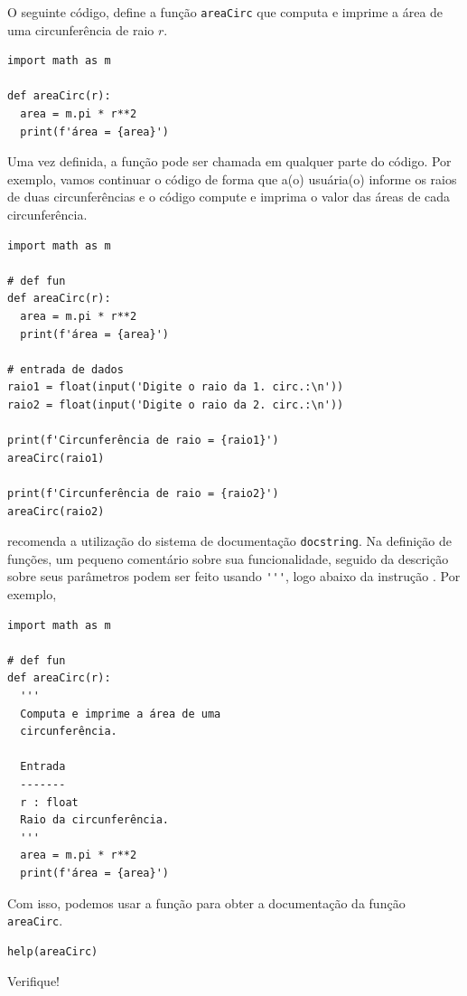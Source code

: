 \begin{ex}\label{cap_fun_sec_def:ex:areaCirc}
  O seguinte código, define a função \lstinline+areaCirc+ que computa e imprime a área de uma circunferência de raio $r$.

\begin{lstlisting}
import math as m

def areaCirc(r):
  area = m.pi * r**2
  print(f'área = {area}')
\end{lstlisting}

Uma vez definida, a função pode ser chamada em qualquer parte do código. Por exemplo, vamos continuar o código de forma que a(o) usuária(o) informe os raios de duas circunferências e o código compute e imprima o valor das áreas de cada circunferência.

\begin{lstlisting}
import math as m

# def fun
def areaCirc(r):
  area = m.pi * r**2
  print(f'área = {area}')
    
# entrada de dados
raio1 = float(input('Digite o raio da 1. circ.:\n'))
raio2 = float(input('Digite o raio da 2. circ.:\n'))

print(f'Circunferência de raio = {raio1}')
areaCirc(raio1)

print(f'Circunferência de raio = {raio2}')
areaCirc(raio2)
\end{lstlisting}

\end{ex}

\begin{obs}
  {\python} recomenda a utilização do sistema de documentação \texttt{docstring}. Na definição de funções, um pequeno comentário sobre sua funcionalidade, seguido da descrição sobre seus parâmetros podem ser feito usando \lstinline+'''+, logo abaixo da instrução {\PYTHONdef}. Por exemplo,

\begin{lstlisting}
import math as m

# def fun
def areaCirc(r):
  '''
  Computa e imprime a área de uma
  circunferência.

  Entrada
  -------
  r : float
  Raio da circunferência.
  '''
  area = m.pi * r**2
  print(f'área = {area}')
\end{lstlisting}

Com isso, podemos usar a função {\PYTHONhelp} para obter a documentação da função \lstinline+areaCirc+.

\begin{lstlisting}
help(areaCirc)
\end{lstlisting}

Verifique!
\end{obs}

